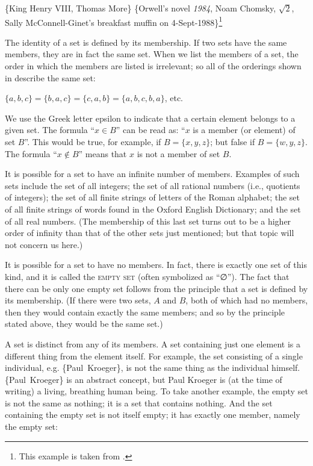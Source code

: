 \ea \label{ex:13.2}
\ea \{King Henry VIII, Thomas More\}
\ex  \{Orwell’s novel \textit{1984}, Noam Chomsky, $\sqrt{2}$, Sally McConnell-Ginet’s breakfast muffin on 4-Sept-1988\}\footnote{This example is taken from \citet[431]{ChierchiaMcConnell-Ginet1990}.}
\z
\z


The identity of a set is defined by its membership. If two sets have the same members, they are in fact the same set. When we list the members of a set, the order in which the members are listed is irrelevant; so all of the orderings shown in  describe the same set:


\ea \label{ex:13.3}
$\{a,b,c\} = \{b,a,c\} = \{c,a,b\} = \{a,b,c,b,a\}$, etc. 
\z


We use the {Greek} letter epsilon to indicate that a certain element belongs to a given set. The formula “$x \in B$” can be read as: “$x$ is a member (or element) of set $B$”. This would be true, for example, if $B = \{x,y,z\}$; but false if $B = \{w,y,z\}$. The formula “$x \notin B$” means that $x$ is not a member of set $B$.



It is possible for a set to have an infinite number of members. Examples of such sets include the set of all integers; the set of all rational numbers (i.e., quotients of integers); the set of all finite strings of letters of the Roman alphabet; the set of all finite strings of words found in the Oxford English Dictionary; and the set of all real numbers. (The membership of this last set turns out to be a higher order of infinity than that of the other sets just mentioned; but that topic will not concern us here.)



It is possible for a set to have no members. In fact, there is exactly one set of this kind, and it is called the \textsc{empty set} (often symbolized as “∅”). The fact that there can be only one empty set follows from the principle that a set is defined by its membership. (If there were two sets, $A$ and $B$, both of which had no members, then they would contain exactly the same members; and so by the principle stated above, they would be the same set.)



A set is distinct from any of its members. A set containing just one element is a different thing from the element itself. For example, the set consisting of a single individual, e.g. \{Paul~Kroeger\}, is not the same thing as the individual himself. \{Paul~Kroeger\} is an abstract concept, but Paul Kroeger is (at the time of writing) a living, breathing human being. To take another example, the empty set is not the same as nothing; it is a set that contains nothing. And the set containing the empty set is not itself empty; it has exactly one member, namely the empty set:


